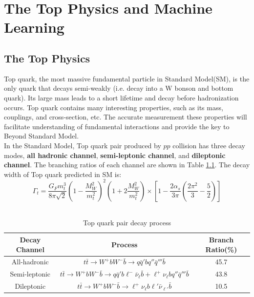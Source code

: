 
\chapter{The Top Physics and Machine Learning}

\section{The Top Physics}

Top quark, the most massive fundamental particle in Standard Model(SM), is the only quark that decays semi-weakly (i.e. decay into a W bonson and bottom quark). Its large mass leads to a short lifetime and decay before hadronization occurs. Top quark contains many interesting properties, such as its mass, couplings, and cross-section, etc. The accurate measurement these properties will facilitate understanding of fundamental interactions and provide the key to Beyond Standard Model.\cite{Zyla:2020zbs}
\\
In the Standard Model, Top quark pair produced by $pp$ collision has three decay modes, \textbf{all hadronic channel}, \textbf{semi-leptonic channel}, and \textbf{dileptonic channel}. The branching ratios of each channel are shown in Table \ref{table:Branchratio}. The decay width of Top quark predicted in SM is\cite{A.Quadt:2008TopPhysics}: 
\begin{equation}
	\Gamma_{t} = \frac{G_{F}m_{t}^{3}}{8\pi\sqrt{2}}\left(1-\frac{M_{W}^{2}}{m_{t}^{2}}\right)^{2}\left(1+2\frac{M_{W}^{2}}{m_{t}^{2}}\right)\times\left[1 - \frac{2\alpha_{s}}{3\pi}\left( \frac{2\pi^{2}}{3} - \frac{5}{2}\right) \right]
\end{equation}
\\
\begin{center}
\begin{table}[h]
\begin{tabular}{ c c c}
	\cline{1-3}
	Decay Channel    & Process & Branch Ratio(\%) \\
	\hline
	All-hadronic      & $t\bar{t}\to W^{+}bW^{-}\bar{b}\to q\bar{q}'bq''\bar{q}'''\bar{b}$    & 45.7     \\
	Semi-leptonic       &   $t\bar{t}\to W^{+}bW^{-}\bar{b}\to q\bar{q}'b\ell^{-}\bar{\nu}_{\ell}\bar{b} + \ell^{+}\nu_{\ell}bq''\bar{q}'''\bar{b}$   & 43.8     \\
	Dileptonic      &   $t\bar{t}\to W^{+}bW^{-}\bar{b}\to \ell^{+}\nu_{\ell}b\ell'\bar{\nu}_{\ell'}\bar{b}$   & 10.5      \\
	\hline
\end{tabular}
\caption{Top quark pair decay process\cite{Zyla:2020zbs}}
\label{table:Branchratio}
\end{table}
\end{center}
